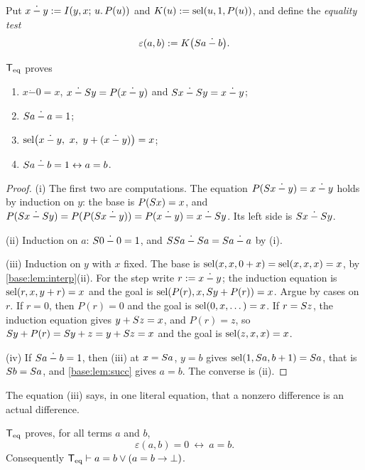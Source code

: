 Put $x\mathbin{\dot-}y\mathrel{:=}I(y,x;\,u.\,P(u))$ and
$K(u)\mathrel{:=}\operatorname{sel}(u,1,P(u))$, and define the \emph{equality test}
\[
 \varepsilon(a,b)\mathrel{:=} K\bigl(S a\mathbin{\dot-}b\bigr).
\]

\begin{lemma}
\label{base:lem:monus}
$\mathsf{T}_{\mathrm{eq}}$ proves
\begin{enumerate}[label=\textup{(\roman*)}]
\item $x\mathbin{\dot-}0=x$, $x\mathbin{\dot-}S y=P(x\mathbin{\dot-}y)$
 and $S x\mathbin{\dot-}S y=x\mathbin{\dot-}y$;
\item $S a\mathbin{\dot-}a=1$;
\item $\sel\bigl(x\mathbin{\dot-}y,\ x,\ y+(x\mathbin{\dot-}y)\bigr)=x$;
\item $S a\mathbin{\dot-}b=1\leftrightarrow a=b$.
\end{enumerate}
\end{lemma}

\begin{proof}
(i) The first two are computations.  The equation
$P(S x\mathbin{\dot-}y)=x\mathbin{\dot-}y$ holds by induction on $y$:
the base is $P(S x)=x$, and
$P(S x\mathbin{\dot-}S y)=P(P(S x\mathbin{\dot-}y))
 =P(x\mathbin{\dot-}y)=x\mathbin{\dot-}S y$.  Its left side is
$S x\mathbin{\dot-}S y$.

(ii) Induction on $a$: $S 0\mathbin{\dot-}0=1$, and
$SS a\mathbin{\dot-}S a=S a\mathbin{\dot-}a$ by (i).

(iii) Induction on $y$ with $x$ fixed.  The base is
$\operatorname{sel}(x,x,0+x)=\operatorname{sel}(x,x,x)=x$, by \cref{base:lem:interp}(ii).  For the step
write $r\mathrel{:=} x\mathbin{\dot-}y$; the induction equation is
$\operatorname{sel}(r,x,y+r)=x$ and the goal is $\operatorname{sel}(P(r),x,S y+P(r))=x$.  Argue by
cases on $r$.  If $r=0$, then $P(r)=0$ and the goal is
$\operatorname{sel}(0,x,\dots)=x$.  If $r=S z$, the induction equation gives
$y+S z=x$, and $P(r)=z$, so
$S y+P(r)=S y+z=y+S z=x$ and the goal is $\operatorname{sel}(z,x,x)=x$.

(iv) If $S a\mathbin{\dot-}b=1$, then (iii) at $x=S a$, $y=b$ gives
$\operatorname{sel}(1,S a,b+1)=S a$, that is $S b=S a$, and
\cref{base:lem:succ} gives $a=b$.  The converse is (ii).
\end{proof}

The equation (iii) says, in one literal equation, that a nonzero difference
is an actual difference.

\begin{theorem}
\label{base:thm:reflect}
$\mathsf{T}_{\mathrm{eq}}$ proves, for all terms $a$ and $b$,
\[
 \varepsilon(a,b)=0\ \leftrightarrow\ a=b .
\]
Consequently $\mathsf{T}_{\mathrm{eq}}\vdash a=b\vee(a=b\to\bot)$.
\end{theorem}

